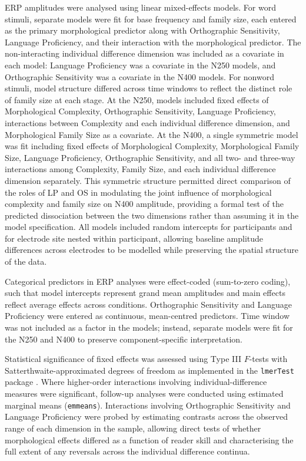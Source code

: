 \documentclass[utf8]{FrontiersinHarvard} %
\begin{document}
	ERP amplitudes were analysed using linear mixed-effects models. For word stimuli, separate models were fit for base frequency and family size, each entered as the primary morphological predictor along with Orthographic Sensitivity, Language Proficiency, and their interaction with the morphological predictor. The non-interacting individual difference dimension was included as a covariate in each model: Language Proficiency was a covariate in the N250 models, and Orthographic Sensitivity was a covariate in the N400 models. For nonword stimuli, model structure differed across time windows to reflect the distinct role of family size at each stage. At the N250, models included fixed effects of Morphological Complexity, Orthographic Sensitivity, Language Proficiency, interactions between Complexity and each individual difference dimension, and Morphological Family Size as a covariate. At the N400, a single symmetric model was fit including fixed effects of Morphological Complexity, Morphological Family Size, Language Proficiency, Orthographic Sensitivity, and all two- and three-way interactions among Complexity, Family Size, and each individual difference dimension separately. This symmetric structure permitted direct comparison of the roles of LP and OS in modulating the joint influence of morphological complexity and family size on N400 amplitude, providing a formal test of the predicted dissociation between the two dimensions rather than assuming it in the model specification. All models included random intercepts for participants and for electrode site nested within participant, allowing baseline amplitude differences across electrodes to be modelled while preserving the spatial structure of the data.
	
	Categorical predictors in ERP analyses were effect-coded (sum-to-zero coding), such that model intercepts represent grand mean amplitudes and main effects reflect average effects across conditions. Orthographic Sensitivity and Language Proficiency were entered as continuous, mean-centred predictors. Time window was not included as a factor in the models; instead, separate models were fit for the N250 and N400 to preserve component-specific interpretation.
	
	Statistical significance of fixed effects was assessed using Type III $F$-tests with Satterthwaite-approximated degrees of freedom as implemented in the \texttt{lmerTest} package \citep{kuznetsovaLmerTestPackageTests2017}. Where higher-order interactions involving individual-difference measures were significant, follow-up analyses were conducted using estimated marginal means (\texttt{emmeans}). Interactions involving Orthographic Sensitivity and Language Proficiency were probed by estimating contrasts across the observed range of each dimension in the sample, allowing direct tests of whether morphological effects differed as a function of reader skill and characterising the full extent of any reversals across the individual difference continua.
	
\end{document}
